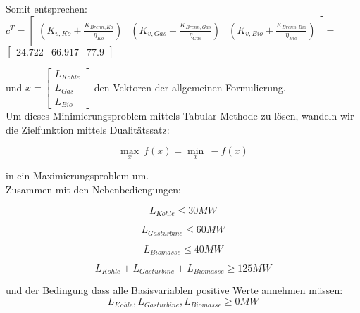 \documentclass{eegreport}
\begin{document}

Somit entsprechen:\\


$c^T=\begin{bmatrix}
(K_{v,Ko} + \frac{K_{Brenn,Ko}}{\eta_{Ko}}) & (K_{v,Gas} + \frac{K_{Brenn,Gas}}{\eta_{Gas}}) & (K_{v,Bio} + \frac{K_{Brenn,Bio}}{\eta_{Bio}})
\end{bmatrix}$= $\begin{bmatrix} 24.722 & 66.917 & 77.9 \end{bmatrix} $

und $x=\begin{bmatrix}
L_{Kohle} \\ 
L_{Gas} \\ 
L_{Bio}
\end{bmatrix}$ 
den Vektoren der allgemeinen Formulierung.\\
Um dieses Minimierungsproblem mittels Tabular-Methode zu lösen, wandeln wir die Zielfunktion mittels
Dualitätssatz:


\begin{equation}
\max_{x}\ f(x) = \min_{x}\ -f(x) 
\end{equation}

in ein Maximierungsproblem um.\\
Zusammen mit den Nebenbediengungen:

\begin{equation}
L_{Kohle} \leq 30MW
\end{equation}

\begin{equation}
L_{Gasturbine} \leq 60MW
\end{equation}

\begin{equation}
L_{Biomasse} \leq 40MW
\end{equation}

\begin{equation}
L_{Kohle} + L_{Gasturbine} + L_{Biomasse} \geq 125MW
\end{equation}

und der Bedingung dass alle Basisvariablen positive Werte annehmen müssen:
\begin{equation}
L_{Kohle},L_{Gasturbine},L_{Biomasse} \geq 0MW
\end{equation}
\end{document}

